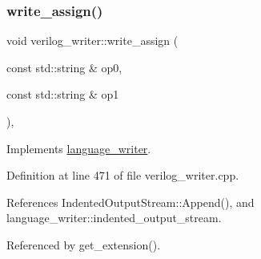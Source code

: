 \subsubsection{\texorpdfstring{write\+\_\+assign()}{write\_assign()}}
{\footnotesize\ttfamily void verilog\+\_\+writer\+::write\+\_\+assign (\begin{DoxyParamCaption}\item[{const std\+::string \&}]{op0,  }\item[{const std\+::string \&}]{op1 }\end{DoxyParamCaption})\hspace{0.3cm}{\ttfamily [override]}, {\ttfamily [virtual]}}



Implements \hyperlink{classlanguage__writer_a49b971e9b90296b0096a78c06219992d}{language\+\_\+writer}.



Definition at line 471 of file verilog\+\_\+writer.\+cpp.



References Indented\+Output\+Stream\+::\+Append(), and language\+\_\+writer\+::indented\+\_\+output\+\_\+stream.



Referenced by get\+\_\+extension().

